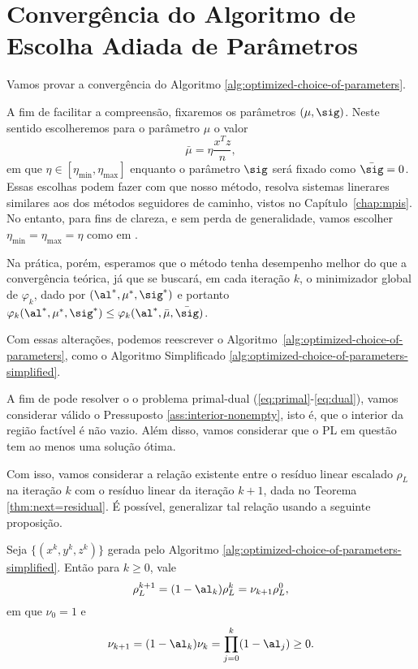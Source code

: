 \section{Convergência do Algoritmo de Escolha Adiada de Parâmetros}



Vamos provar  a convergência do Algoritmo \ref{alg:optimized-choice-of-parameters}. 

A fim de facilitar a compreensão, fixaremos os parâmetros $(\mu,\sig)$. Neste sentido escolheremos para o parâmetro  $\mu$ o valor \[\bar{\mu}=\eta\dfrac{x^Tz}{n},
\] 
em que $\eta\in [\eta_{\min},\eta_{\max} ]$ enquanto o parâmetro $\sig$ será fixado como $\bar{\sig} = 0$. Essas escolhas  podem fazer com que nosso método, resolva  sistemas linerares similares aos dos métodos seguidores de caminho, vistos no Capítulo~\ref{chap:mpis}.  No entanto, para fins de clareza, e sem perda de generalidade, vamos escolher $\eta_{\min}=\eta_{\max}=\eta $ como em  
\cite{Zhang:1995fu}.


 Na prática, porém, esperamos que  o método  tenha desempenho melhor do que a convergência teórica, já que se buscará, em cada iteração $k$,
o minimizador global de $\varphi_k$, dado por $(\al^*,\mu^*,\sig^*)$ e portanto	$\varphi_k(\al^*,\mu^*,\sig^*)\leq \varphi_k(\al^*,\bar{\mu},\bar{\sig})$.


Com essas alterações, podemos reescrever o Algoritmo~\ref{alg:optimized-choice-of-parameters}, como o  Algoritmo Simplificado \ref{alg:optimized-choice-of-parameters-simplified}.


A fim de pode  resolver o o problema primal-dual (\ref{eq:primal}-\ref{eq:dual}), vamos considerar válido o Pressuposto \ref{ass:interior-nonempty}, isto é, que o interior da região factível é não vazio. Além disso, vamos considerar que o \acl{PL} em questão tem ao menos uma solução ótima. 


Com isso, vamos considerar a relação existente entre o resíduo linear escalado $\rho_L$ na iteração $k$ com o resíduo 
linear da iteração $k+1$, dada no Teorema \ref{thm:next=residual}. É possível, generalizar tal relação usando a seguinte proposição. 
\begin{prop} Seja $\{(x^k,y^k,z^k)\}$ gerada pelo Algoritmo \ref{alg:optimized-choice-of-parameters-simplified}. Então para $k\geq0$, vale  
\begin{equation}
\label{eq:residual-norm-relation}
 \rho_L^{k+1}  = (1-\al_k) \rho_L^{k} = \nu_{k+1}  \rho_L^{0},
\end{equation}
em que  $\nu_0 = 1$ e 
\[
\nu_{k+1} = (1-\al_k)\nu_k = \prod_{j=0}^{k}(1-\al_j) \geq 0.
\]
\end{prop}

